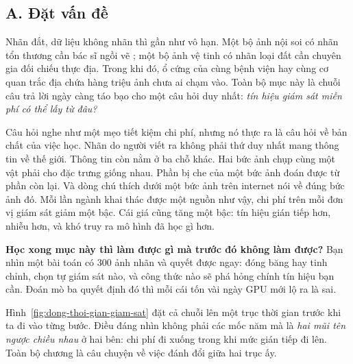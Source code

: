 \documentclass[../../../deep_learning.tex]{subfiles}
\begin{document}
\subsection{A. Đặt vấn đề}
Nhãn đắt, dữ liệu không nhãn thì gần như vô hạn. Một bộ ảnh nội soi có nhãn tổn thương cần bác sĩ ngồi vẽ ; một bộ ảnh vệ tinh có nhãn loại đất cần chuyên gia đối chiếu thực địa. Trong khi đó, ổ cứng của cùng bệnh viện hay cùng cơ quan trắc địa chứa hàng triệu ảnh chưa ai chạm vào. Toàn bộ mục này là chuỗi câu trả lời ngày càng táo bạo cho một câu hỏi duy nhất: \emph{tín hiệu giám sát miễn phí có thể lấy từ đâu?}

Câu hỏi nghe như một mẹo tiết kiệm chi phí, nhưng nó thực ra là câu hỏi về bản chất của việc học. Nhãn do người viết ra không phải thứ duy nhất mang thông tin về thế giới. Thông tin còn nằm ở ba chỗ khác. Hai bức ảnh chụp cùng một vật phải cho đặc trưng giống nhau. Phần bị che của một bức ảnh đoán được từ phần còn lại. Và dòng chú thích dưới một bức ảnh trên internet nói về đúng bức ảnh đó. Mỗi lần ngành khai thác được một nguồn như vậy, chi phí trên mỗi đơn vị giám sát giảm một bậc. Cái giá cũng tăng một bậc: tín hiệu gián tiếp hơn, nhiễu hơn, và khó truy ra mô hình đã học gì hơn.

\textbf{Học xong mục này thì làm được gì mà trước đó không làm được?} Bạn nhìn một bài toán có 300 ảnh nhãn và quyết được ngay: đóng băng hay tinh chỉnh, chọn  tự giám sát nào, và công thức  nào sẽ phá hỏng chính tín hiệu bạn cần. Đoán mò ba quyết định đó thì mỗi cái tốn vài ngày GPU mới lộ ra là sai.

Hình~\ref{fig:dong-thoi-gian-giam-sat} đặt cả chuỗi lên một trục thời gian trước khi ta đi vào từng bước. Điều đáng nhìn không phải các mốc năm mà là \emph{hai mũi tên ngược chiều nhau} ở hai bên: chi phí đi xuống trong khi mức gián tiếp đi lên. Toàn bộ chương là câu chuyện về việc đánh đổi giữa hai trục ấy.
\end{document}

